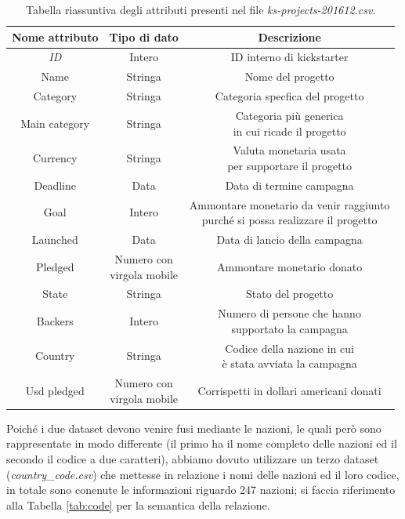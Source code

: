 \begin{table}
	\caption{Tabella riassuntiva degli attributi presenti nel file \textit{ks-projects-201612.csv}.}
	
	\label{tab:ks}
	
	\centering
	\begin{tabular}{|c|c|c|}
		\hline
		\textbf{Nome attributo} & \textbf{Tipo di dato} & \textbf{Descrizione} \\ 
		\hline  
		\rule{0pt}{13pt}\emph{ID} & Intero & ID interno di kickstarter \\ 
		\hline  
		\rule{0pt}{13pt}Name & Stringa & Nome del progetto \\ 
		\hline  
		\rule{0pt}{13pt}Category & Stringa & Categoria specfica del progetto \\ 
		\hline  
		\rule{0pt}{24pt}Main category & Stringa & \shortstack{Categoria più generica \\ in cui ricade il progetto} \\ 
		\hline   
		\rule{0pt}{24pt}Currency & Stringa & \shortstack{Valuta monetaria usata \\ per supportare il progetto} \\ 
		\hline   
		\rule{0pt}{13pt}Deadline & Data & Data di termine campagna \\ 
		\hline   
		\rule{0pt}{24pt}Goal & Intero & \shortstack{Ammontare monetario da venir raggiunto \\ purché si possa realizzare il progetto} \\ 
		\hline  
		\rule{0pt}{13pt}Launched & Data & Data di lancio della campagna \\ 
		\hline  
		\rule{0pt}{24pt}Pledged & \shortstack{Numero con \\ virgola mobile} & Ammontare monetario donato \\ 
		\hline  
		\rule{0pt}{13pt}State & Stringa & Stato del progetto \\ 
		\hline  
		\rule{0pt}{24pt}Backers & Intero & \shortstack{Numero di persone che hanno \\ supportato la campagna} \\ 
		\hline  
		\rule{0pt}{24pt}Country & Stringa & \shortstack{Codice della nazione in cui \\ è stata avviata la campagna} \\ 
		\hline  
		\rule{0pt}{24pt}Usd pledged & \shortstack{Numero con \\ virgola mobile} & Corrispetti in dollari americani donati \\ 
		\hline
	\end{tabular}
\end{table} 
Poiché i due dataset devono venire fusi mediante le nazioni, le quali però sono rappresentate in modo differente (il primo ha il nome completo delle nazioni ed il secondo il codice a due caratteri), abbiamo dovuto utilizzare un terzo dataset (\textit{country\_code.csv}) che mettesse in relazione i nomi delle nazioni ed il loro codice, in totale sono conenute le informazioni riguardo 247 nazioni; si faccia riferimento alla Tabella \ref{tab:code} per la semantica della relazione.

